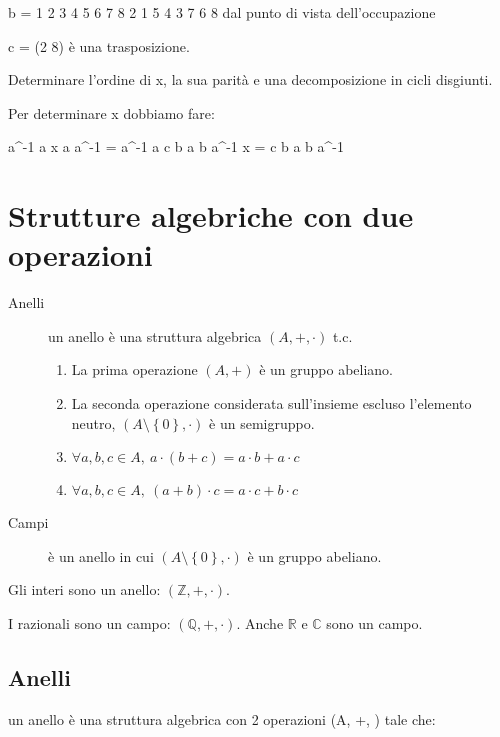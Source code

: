 b = 
1 2 3 4 5 6 7 8
2 1 5 4 3 7 6 8
dal punto di vista dell'occupazione

c = (2 8)
\`e una trasposizione.

Determinare l'ordine di x, la sua parit\`a e una decomposizione in cicli disgiunti.

Per determinare x dobbiamo fare:

a^{-1} a x a a^{-1} = a^{-1} a c b a b a^{-1}
x = c b a b a^{-1}


\section{Strutture algebriche con due operazioni}

\begin{description}
    \item[Anelli] un anello \`e una struttura algebrica $(A, +, \cdot)$ t.c. 
    \begin{enumerate}
        \item La prima operazione $\left( A, + \right )$ \`e un gruppo abeliano.
        \item La seconda operazione considerata sull'insieme escluso l'elemento neutro, $(A \setminus \left \{ 0 \right \}, \cdot )$ \`e un semigruppo.
        \item $ \forall a, b, c \in A , \ a \cdot (b + c) = a \cdot b + a \cdot c $
        \item $ \forall a, b, c \in A , \ (a + b) \cdot c = a \cdot c + b \cdot c $
    \end{enumerate}
    \item[Campi] \`e un anello in cui $( A \setminus \left \{ 0 \right \}, \cdot )$ \`e un gruppo abeliano.
\end{description}

Gli interi sono un anello: $\left ( \mathbb{Z}, +, \cdot \right )$.

I razionali sono un campo: $\left ( \mathbb{Q}, +, \cdot \right )$. Anche $\mathbb{R}$ e $\mathbb{C}$ sono un campo.


\subsection{Anelli}

un anello \`e una struttura algebrica con 2 operazioni (A, +, \cdot) tale che:

